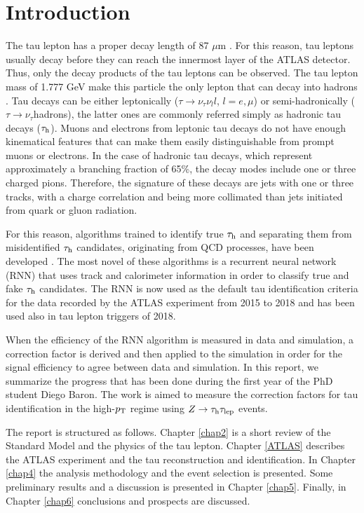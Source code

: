 \chapter{Introduction}\label{chap:introduction}
The tau lepton has a proper decay length of 87 $\mu$m \cite{PhysRevD.98.030001}. For this reason, tau leptons usually decay before they can reach the innermost layer of the ATLAS detector. Thus, only the decay products of the tau leptons can be observed. The tau lepton mass of 1.777 GeV make this particle the only lepton that can decay into hadrons \cite{PhysRevD.98.030001}. Tau decays can be either leptonically ($\tau\to\nu_\tau\nu_l l$, $l=e,\mu$) or semi-hadronically ($\tau\to\nu_\tau$hadrons), the latter ones are commonly referred simply as hadronic tau decays ($\tau_\text{h}$). Muons and electrons from leptonic tau decays do not have enough kinematical features that can make them easily distinguishable from prompt muons or electrons. In the case of hadronic tau decays, which represent approximately a branching fraction of 65\%, the decay modes include one or three charged pions. Therefore, the signature of these decays are jets with one or three tracks, with a charge correlation and being more collimated than jets initiated from quark or gluon radiation.

For this reason, algorithms trained to identify true $\tau_\text{h}$ and separating them from misidentified $\tau_\text{h}$  candidates, originating from QCD processes, have been developed \cite{Deutsch:2680523}. The most novel of these algorithms is a recurrent neural network (RNN) that uses track and calorimeter information in order to classify true and fake $\tau_\text{h}$ candidates. The RNN is now used as the default tau identification criteria for the data recorded by the ATLAS experiment from 2015 to 2018 and has been used also in tau lepton triggers of 2018.

When the efficiency of the RNN algorithm is measured in data and simulation, a correction factor is derived and then applied to the simulation in order for the signal efficiency to agree between data and simulation. In this report, we summarize the progress that has been done during the first year of the PhD student Diego Baron. The work is aimed to measure the correction factors for tau identification in the high-$p_\text{T}$ regime using $Z\to\tau_\text{h}\tau_\text{lep}$ events.

The report is structured as follows. Chapter \ref{chap2} is a short review of the Standard Model and the physics of the tau lepton. Chapter \ref{ATLAS} describes the ATLAS experiment and the tau reconstruction and identification. In Chapter \ref{chap4} the analysis methodology and the event selection is presented. Some preliminary results and a discussion is presented in Chapter \ref{chap5}. Finally, in Chapter \ref{chap6} conclusions and prospects are discussed.
